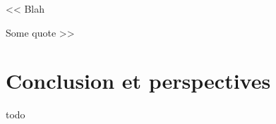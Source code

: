 \begin{savequote}[.5\textwidth]
<< Blah

\quad Some quote >>
\end{savequote}

\chapter{Conclusion et perspectives}\label{chap:conclusion}
\chaptertoc

todo

%
%

